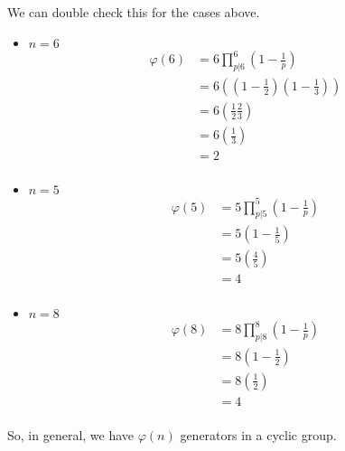 \documentclass[12pt,letterpaper]{article}
\begin{document}
\begin{enumerate}
\begin{enumerate}
          We can double check this for the cases above.

          \begin{itemize}
            \item $n = 6$
              \begin{align*}
                \varphi(6) &= 6\prod_{p|6}^6\left(1-\frac{1}{p}\right) \\
                &= 6\left(\left(1-\frac{1}{2}\right)\left(1-\frac{1}{3}\right)\right) \\
                &= 6\left(\frac{1}{2}\frac{2}{3}\right) \\
                &= 6\left(\frac{1}{3}\right) \\
                &= 2 \\
              \end{align*}
            \item $n = 5$
              \begin{align*}
                \varphi(5) &= 5\prod_{p|5}^5\left(1-\frac{1}{p}\right) \\
                &= 5\left(1-\frac{1}{5}\right) \\
                &= 5\left(\frac{4}{5}\right) \\
                &= 4 \\
              \end{align*}
            \item $n = 8$
              \begin{align*}
                \varphi(8) &= 8\prod_{p|8}^8\left(1-\frac{1}{p}\right) \\
                &= 8\left(1-\frac{1}{2}\right) \\
                &= 8\left(\frac{1}{2}\right) \\
                &= 4 \\
              \end{align*}
          \end{itemize}

          So, in general, we have $\varphi(n)$ generators in a cyclic group.
      \end{enumerate}
  \end{enumerate}
\end{document}
